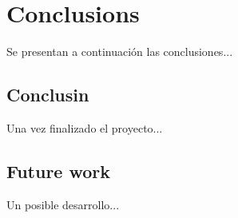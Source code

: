 \chapter{Conclusions}

Se presentan a continuación las conclusiones...

\section{Conclusin}

Una vez finalizado el proyecto...

\section{Future work}

Un posible desarrollo...